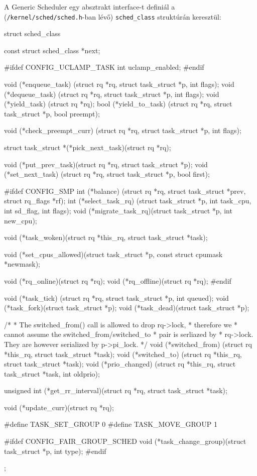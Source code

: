 A Generic Scheduler egy absztrakt interface-t definiál a (\texttt{/kernel/sched/sched.h}-ban lévő) \texttt{sched\_class} struktúrán keresztül:
\begin{cpp}
struct sched_class {
	const struct sched_class *next;

#ifdef CONFIG_UCLAMP_TASK
	int uclamp_enabled;
#endif

	void (*enqueue_task)
		(struct rq *rq, struct task_struct *p, int flags);
	void (*dequeue_task)
		(struct rq *rq, struct task_struct *p, int flags);
	void (*yield_task)   (struct rq *rq);
	bool (*yield_to_task)
		(struct rq *rq, struct task_struct *p, bool preempt);

	void (*check_preempt_curr)
		(struct rq *rq, struct task_struct *p, int flags);

	struct task_struct *(*pick_next_task)(struct rq *rq);

	void (*put_prev_task)(struct rq *rq, struct task_struct *p);
	void (*set_next_task)
		(struct rq *rq, struct task_struct *p, bool first);

#ifdef CONFIG_SMP
	int (*balance)
	  (struct rq *rq, struct task_struct *prev, struct rq_flags *rf);
	int  (*select_task_rq)
	  (struct task_struct *p, int task_cpu, int sd_flag, int flags);
	void (*migrate_task_rq)(struct task_struct *p, int new_cpu);

	void (*task_woken)(struct rq *this_rq, struct task_struct *task);

	void (*set_cpus_allowed)(struct task_struct *p,
				 const struct cpumask *newmask);

	void (*rq_online)(struct rq *rq);
	void (*rq_offline)(struct rq *rq);
#endif

	void (*task_tick)
		(struct rq *rq, struct task_struct *p, int queued);
	void (*task_fork)(struct task_struct *p);
	void (*task_dead)(struct task_struct *p);

	/*
	 * The switched_from() call is allowed to drop rq->lock, 
	 * therefore we
	 * cannot assume the switched_from/switched_to 
	 * pair is serliazed by
	 * rq->lock. They are however serialized by p->pi_lock.
	 */
	void (*switched_from)
		(struct rq *this_rq, struct task_struct *task);
	void (*switched_to) 
		(struct rq *this_rq, struct task_struct *task);
	void (*prio_changed)
		(struct rq *this_rq, struct task_struct *task,
			      int oldprio);

	unsigned int (*get_rr_interval)(struct rq *rq,
					struct task_struct *task);

	void (*update_curr)(struct rq *rq);

#define TASK_SET_GROUP		0
#define TASK_MOVE_GROUP		1

#ifdef CONFIG_FAIR_GROUP_SCHED
	void (*task_change_group)(struct task_struct *p, int type);
#endif
};

\end{cpp}
 
